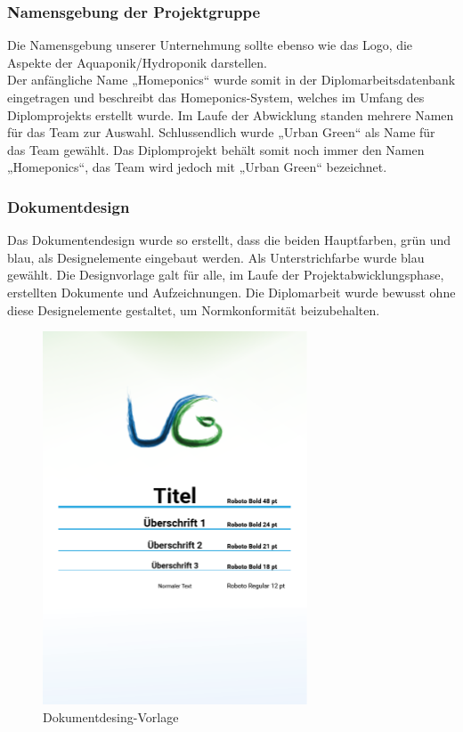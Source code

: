\subsubsection{Namensgebung der Projektgruppe}
Die Namensgebung unserer Unternehmung sollte ebenso wie das Logo, die Aspekte der Aquaponik/Hydroponik darstellen.\\
Der anfängliche Name „Homeponics“ wurde somit in der Diplomarbeitsdatenbank eingetragen und beschreibt das Homeponics-System, welches im Umfang des Diplomprojekts erstellt wurde. Im Laufe der Abwicklung standen mehrere Namen für das Team zur Auswahl. Schlussendlich wurde „Urban Green“ als Name für das Team gewählt. Das Diplomprojekt behält somit noch immer den Namen „Homeponics“, das Team wird jedoch mit „Urban Green“ bezeichnet.
\newpage

\subsubsection{Dokumentdesign}
Das Dokumentendesign wurde so erstellt, dass die beiden Hauptfarben, grün und blau, als Designelemente eingebaut werden. Als Unterstrichfarbe wurde blau gewählt. Die Designvorlage galt für alle, im Laufe der Projektabwicklungsphase, erstellten Dokumente und Aufzeichnungen. Die Diplomarbeit wurde bewusst ohne diese Designelemente gestaltet, um Normkonformität beizubehalten.\mbox{}\\
\begin{figure}[ht]
    \centering
    \includegraphics[width=0.7\textwidth]{images/Dokumentdesign}
	\caption{Dokumentdesing-Vorlage}
\end{figure}\textbf{}